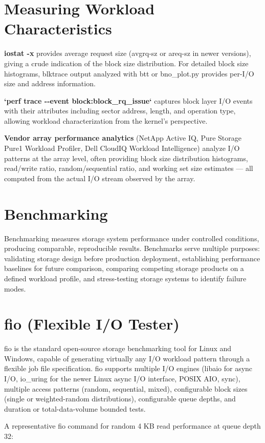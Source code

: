 \section{Measuring Workload Characteristics}
\textbf{iostat -x} provides average request size (avgrq-sz or areq-sz in newer versions), giving a crude indication of the block size distribution. For detailed block size histograms, blktrace output analyzed with btt or bno\_plot.py provides per-I/O size and address information.

\textbf{`perf trace -\/-event block:block\_rq\_issue`} captures block layer I/O events with their attributes including sector address, length, and operation type, allowing workload characterization from the kernel's perspective.

\textbf{Vendor array performance analytics} (NetApp Active IQ, Pure Storage Pure1 Workload Profiler, Dell CloudIQ Workload Intelligence) analyze I/O patterns at the array level, often providing block size distribution histograms, read/write ratio, random/sequential ratio, and working set size estimates --- all computed from the actual I/O stream observed by the array.

\section{Benchmarking}
Benchmarking measures storage system performance under controlled conditions, producing comparable, reproducible results. Benchmarks serve multiple purposes: validating storage design before production deployment, establishing performance baselines for future comparison, comparing competing storage products on a defined workload profile, and stress-testing storage systems to identify failure modes.

\section{fio (Flexible I/O Tester)}
fio is the standard open-source storage benchmarking tool for Linux and Windows, capable of generating virtually any I/O workload pattern through a flexible job file specification. fio supports multiple I/O engines (libaio for async I/O, io\_uring for the newer Linux async I/O interface, POSIX AIO, sync), multiple access patterns (random, sequential, mixed), configurable block sizes (single or weighted-random distributions), configurable queue depths, and duration or total-data-volume bounded tests.

A representative fio command for random 4 KB read performance at queue depth 32:

